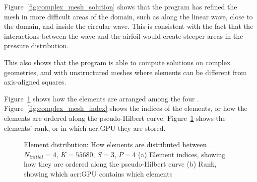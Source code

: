 Figure~\ref{fig:complex_mesh_solution} shows that the program has refined the mesh in more difficult
areas of the domain, such as along the linear wave, close to the domain, and inside the circular
wave. This is consistent with the fact that the interactions between the wave and the airfoil would
create steeper areas in the pressure distribution.

This also shows that the program is able to compute solutions on complex geometries, and with
unstructured meshes where elements can be different from axis-aligned squares.

Figure~\ref{fig:complex_mesh_elements} shows how the elements are arranged among the four
. Figure~\ref{fig:complex_mesh_index} shows the indices of the elements, or how
the elements are ordered along the pseudo-Hilbert curve. Figure~\ref{fig:complex_mesh_elements}
shows the elements' rank, or in which \acrshort{acr:GPU} they are stored.

\begin{figure}[H]
	\centering
	\hfill
	\caption{Element distribution: How elements are distributed between . \(N_{initial} = 4\), \(K = 55680\), \(S = 3\), \(P = 4\) (a) Element indices, showing how they are ordered along the pseudo-Hilbert curve (b) Rank, showing which \acrshort{acr:GPU} contains which elements}\label{fig:complex_mesh_elements}
\end{figure}

